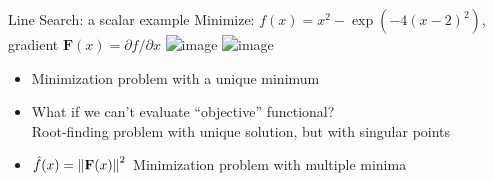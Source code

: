 \documentclass{beamer}
\newcommand{\vF}{\mathbf{F}}
\begin{document}
\begin{frame}{Line Search: a scalar example}
  Minimize: $f(x) = x^2 - \exp(-4 (x-2)^2)$, gradient $\vF(x) = \partial f/\partial x$
  \includegraphics<1>[width=0.5\textwidth]{figures/LineSearch/SimpleExample}
  \includegraphics<2>[width=0.5\textwidth]{figures/LineSearch/SimpleReformulatedOptimization}
  \begin{itemize} \vspace{-1ex}
  \item Minimization problem with a unique minimum
  \item What if we can't evaluate ``objective'' functional? \\
    Root-finding problem with unique solution, but with singular points
  \item<2> $\hat f(x) = \norm{\vF(x)}^2$ \alert{Minimization problem with multiple minima}
  \end{itemize}
\end{frame}
\end{document}
